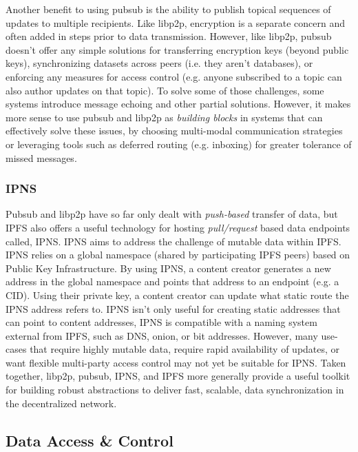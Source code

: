\documentclass{textile}
\begin{document}
Another benefit to using pubsub is the ability to publish topical sequences of updates to multiple recipients. Like libp2p, encryption is a separate concern and often added in steps prior to data transmission. However, like libp2p, pubsub doesn't offer any simple solutions for transferring encryption keys (beyond public keys), synchronizing datasets across peers (i.e. they aren't databases), or enforcing any measures for access control (e.g. anyone subscribed to a topic can also author updates on that topic). To solve some of those challenges, some systems introduce message echoing and other partial solutions. However, it makes more sense to use pubsub and libp2p as \emph{building blocks} in systems that can effectively solve these issues, by choosing multi-modal communication strategies or leveraging tools such as deferred routing (e.g. inboxing) for greater tolerance of missed messages.

\subsubsection{IPNS}

Pubsub and libp2p have so far only dealt with \emph{push-based} transfer of data, but IPFS also offers a useful technology for hosting \emph{pull/request} based data endpoints called, IPNS. IPNS aims to address the challenge of mutable data within IPFS. IPNS relies on a global namespace (shared by participating IPFS peers) based on Public Key Infrastructure. By using IPNS, a content creator generates a new address in the global namespace and points that address to an endpoint (e.g. a CID). Using their private key, a content creator can update what static route the IPNS address refers to. IPNS isn't only useful for creating static addresses that can point to content addresses, IPNS is compatible with a naming system external from IPFS, such as DNS, onion, or bit addresses. However, many use-cases that require highly mutable data, require rapid availability of updates, or want flexible multi-party access control may not yet be suitable for IPNS. Taken together, libp2p, pubsub, IPNS, and IPFS more generally provide a useful toolkit for building robust abstractions to deliver fast, scalable, data synchronization in the decentralized network. 

\subsection{Data Access \& Control}
\end{document}
